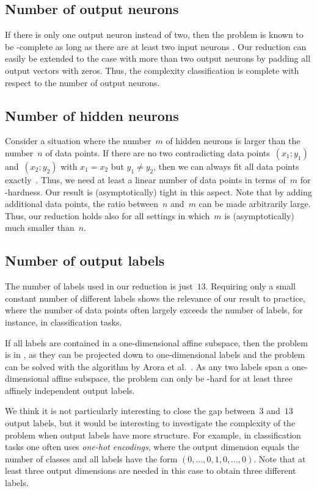 \documentclass{toc}
\begin{document}
\subsection{Number of output neurons}
If there is only one output neuron instead of two, then the problem is known to be \NP-complete
%
as long as there are at least two input neurons \cite{Arora2018_Understanding, Froese2023_FixedDimension}.
%
%
%
%
Our reduction can easily be extended to the case with more than two output neurons by padding all output vectors with zeros.
Thus, the complexity classification is complete with respect to the number of output neurons.

\subsection{Number of hidden neurons}
Consider a situation where the number~$m$ of hidden neurons is larger
than the number~$n$ of data points.
If there are no two contradicting data points~$(x_1; y_1)$ and~$(x_2; y_2)$ with $x_1 = x_2$ but $y_1 \neq y_2$, then we can always fit all data points exactly~\cite{Zhang2021_Understanding}.
Thus, we need at least a linear number of data points in terms of~$m$ for \ER-hardness.
Our result is (asymptotically) tight in this aspect.
Note that by adding additional data points, the ratio between~$n$ and~$m$ can be made arbitrarily large.
Thus, our reduction holds also for all settings in which~$m$ is (asymptotically) much smaller than~$n$.

\subsection{Number of output labels}
The number of labels used in our reduction is just~$13$.
Requiring only a small constant number of different labels shows the relevance of our result to practice, where the number of data points often largely exceeds the number of labels, for instance, in classification tasks.

If all labels are contained in a one-dimensional affine subspace, then the problem is in \NP, as they can be projected down to one-dimensional labels and the problem can be solved with the algorithm by Arora et al.~\cite{Arora2018_Understanding}.
As any two labels span a one-dimensional affine subspace, the problem can only be \ER-hard for at least three affinely independent output labels.

We think it is not particularly interesting to close the gap between~$3$ and~$13$ output labels, but it would be interesting to investigate the complexity of the problem when output labels have more structure.
For example, in classification tasks one often uses \emph{one-hot encodings}, where the output dimension equals the number of classes and all labels have the form $(0, \ldots, 0, 1, 0, \ldots, 0)$.
Note that at least three output dimensions are needed in this case to obtain three different labels.
\end{document}
